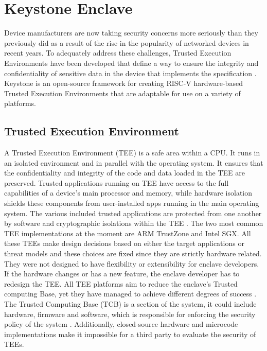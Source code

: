 \section{Keystone Enclave}
Device manufacturers are now taking security concerns more seriously than they previously did as a result of the rise in the popularity of networked devices in recent years.
To adequately address these challenges, Trusted Execution Environments have been developed that define a way to ensure the integrity and confidentiality of sensitive data in the device that implements the specification \cite{IntroTEE}. Keystone \cite{lee2020keystone} is an open-source framework for creating RISC-V hardware-based Trusted Execution Environments that are adaptable for use on a variety of platforms. 

\subsection{Trusted Execution Environment}
A Trusted Execution Environment (TEE) is a safe area within a CPU. It runs in an isolated environment and in parallel with the operating system.
It ensures that the confidentiality and integrity of the code and data loaded in the TEE are preserved. 
Trusted applications running on TEE have access to the full capabilities of a device's main processor and memory, while hardware isolation shields these components from user-installed apps running in the main operating system. The various included trusted applications are protected from one another by software and cryptographic isolations within the TEE \cite{IntroTEE}.
The two most common TEE implementations at the moment are ARM TrustZone and Intel SGX. All these TEEs make design decisions based on either the target applications or threat models and these choices are fixed since they are strictly hardware related. They were not designed to have flexibility or extensibility for enclave developers. If the hardware changes or has a new feature, the enclave developer has to redesign the TEE.
All TEE platforms aim to reduce the enclave's Trusted computing Base, yet they have managed to achieve different degrees of success \cite{keysyone-blog-1}. The Trusted Computing Base (TCB) is a section of the system, it could include hardware, firmware and software, which is responsible for enforcing the security policy of the system \cite{tcb-def}. Additionally, closed-source hardware and microcode implementations make it impossible for a third party to evaluate the security of TEEs.

